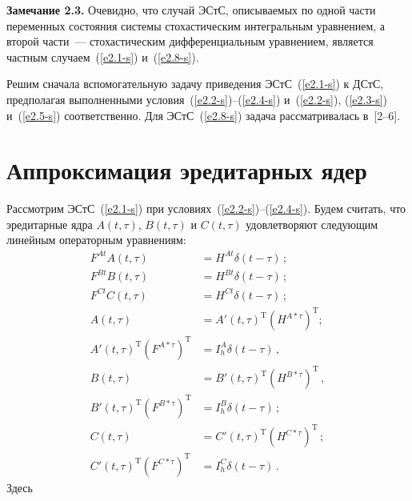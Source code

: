 \begin{multicols}{2}
\noindent
\textbf{Замечание 2.3.} Очевидно, что случай ЭСтС, описываемых по одной
части переменных состояния системы стохастическим интегральным
уравнением, а второй части~--- стохастическим дифференциальным
уравнением, является частным случаем~(\ref{e2.1-s}) и~(\ref{e2.8-s}).

Решим сначала вспомогательную задачу приведения ЭСтС~(\ref{e2.1-s}) к ДСтС, 
предполагая выполненными условия~(\ref{e2.2-s})--(\ref{e2.4-s}) и~(\ref{e2.2-s}), 
(\ref{e2.3-s}) и~(\ref{e2.5-s}) 
соответственно. Для ЭСтС~(\ref{e2.8-s}) задача рассматривалась в~[2--6].

\vspace*{-2pt}

\section{Аппроксимация эредитарных ядер }

Рассмотрим ЭСтС~(\ref{e2.1-s}) при условиях~(\ref{e2.2-s})--(\ref{e2.4-s}). 
Будем считать, что эредитарные ядра  $A(t,\tau)$, $B(t,\tau)$ и $C(t,\tau)$ 
удовлетворяют следующим линейным операторным уравнениям:
\begin{align*}
F^{At}A(t,\tau) &= H^{At} \delta (t-\tau)\,;\\
F^{Bt}B(t,\tau) &= H^{Bt} \delta (t-\tau)\,;\\ 
F^{Ct}C(t,\tau) &= H^{Ct} \delta (t-\tau)\,;
\\
A(t,\tau)&= A'(t,\tau)^{\mathrm{T}} (H^{A*\tau})^{\mathrm{T}};\\
A'(t,\tau)^{\mathrm{T}} (F^{A*\tau})^{\mathrm{T}}&= I_h^A\delta(t-\tau)\,,\\
B(t,\tau)&= B'(t,\tau)^{\mathrm{T}} (H^{B*\tau})^{\mathrm{T}}\,,\\
B'(t,\tau)^{\mathrm{T}} (F^{B*\tau})^{\mathrm{T}}&= I_h^B\delta(t-\tau)\,;\\
C(t,\tau)&= C'(t,\tau)^{\mathrm{T}} (H^{C*\tau})^{\mathrm{T}}\,;\\
C'(t,\tau)^{\mathrm{T}} (F^{C*\tau})^{\mathrm{T}}&= I_h^C\delta(t-\tau)\,.
    \end{align*}
Здесь


\end{multicols}
